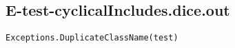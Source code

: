 \subsection{E-test-cyclicalIncludes.dice.out}
\begin{verbatim}
Exceptions.DuplicateClassName(test)

\end{verbatim}
